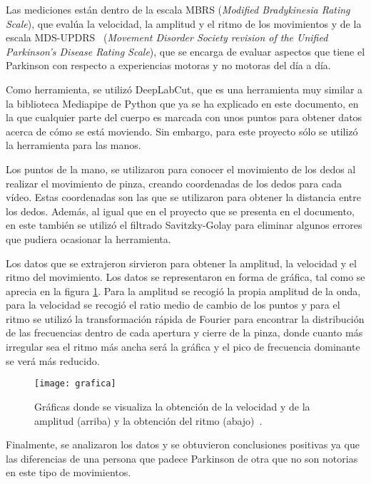 Las mediciones están dentro de la escala MBRS (\textit{Modified Bradykinesia Rating Scale}), que evalúa la velocidad, la amplitud y el ritmo de los movimientos y de la escala MDS-UPDRS~\cite{goetz2008mds} (\textit{Movement Disorder Society revision of the Unified Parkinson's Disease Rating Scale}), que se encarga de evaluar aspectos que tiene el Parkinson con respecto a experiencias motoras y no motoras del día a día.

Como herramienta, se utilizó DeepLabCut, que es una herramienta muy similar a la biblioteca Mediapipe de Python que ya se ha explicado en este documento, en la que cualquier parte del cuerpo es marcada con unos puntos para obtener datos acerca de cómo se está moviendo. Sin embargo, para este proyecto sólo se utilizó la herramienta para las manos.

Los puntos de la mano, se utilizaron para conocer el movimiento de los dedos al realizar el movimiento de pinza, creando coordenadas de los dedos para cada vídeo. Estas coordenadas son las que se utilizaron para obtener la distancia entre los dedos. Además, al igual que en el proyecto que se presenta en el documento, en este también se utilizó el filtrado Savitzky-Golay para eliminar algunos errores que pudiera ocasionar la herramienta.

Los datos que se extrajeron sirvieron para obtener la amplitud, la velocidad y el ritmo del movimiento. Los datos se representaron en forma de gráfica, tal como se aprecia en la figura \ref{fig:grafica}. Para la amplitud se recogió la propia amplitud de la onda, para la velocidad se recogió el ratio medio de cambio de los puntos y para el ritmo se utilizó la transformación rápida de Fourier para encontrar la distribución de las frecuencias dentro de cada apertura y cierre de la pinza, donde cuanto más irregular sea el ritmo más ancha será la gráfica y el pico de frecuencia dominante se verá más reducido.

\begin{figure}[h]
	\texttt{[image: grafica]}
	\caption[Gráficas donde se visualiza la obtención de la velocidad, de la amplitud y del ritmo.]{Gráficas donde se visualiza la obtención de la velocidad y de la amplitud (arriba) y la obtención del ritmo (abajo)~\cite{goetz2008mds}.}
	\label{fig:grafica}
\end{figure}

Finalmente, se analizaron los datos y se obtuvieron conclusiones positivas ya que las diferencias de una persona que padece Parkinson de otra que no son notorias en este tipo de movimientos.

